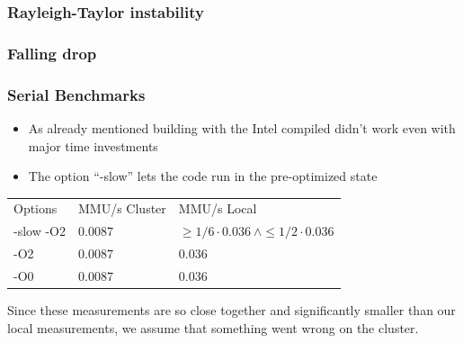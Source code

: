 \begin{frame}
	\frametitle{Rayleigh-Taylor instability}
	\begin{figure}[h!]
		\centering    
	\end{figure} 
\end{frame}

\begin{frame}
	\frametitle{Falling drop}
	\begin{figure}[h!]
		\centering    
	\end{figure} 
\end{frame}

\begin{frame}
	\frametitle{Serial Benchmarks}
	\large
	\begin{itemize}
		\item As already mentioned building with the Intel compiled didn't work even with major time investments
		\item The option "`-slow"' lets the code run in the pre-optimized state
	\end{itemize}
	
	\Large
	\centering
	\begin{tabular}{lll}
		Options   & MMU/s Cluster & MMU/s Local\\
		-slow -O2 & $0.0087$ & $\geq 1/6 \cdot 0.036\  \land \leq 1/2 \cdot 0.036$ \\
		-O2 	  & $0.0087$ & $0.036$\\
		-O0 	  & $0.0087$ & $0.036$\\	
	\end{tabular}

	\large
	Since these measurements are so close together and significantly smaller than our local measurements, we assume that something went wrong on the cluster.

\end{frame}

